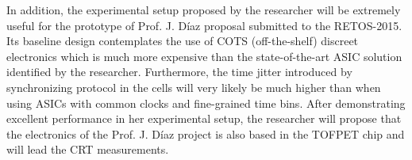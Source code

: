 In addition, the experimental setup proposed by the researcher will be extremely useful for the prototype of Prof. J. D\'iaz proposal submitted to the RETOS-2015. Its baseline design contemplates the use of COTS (off-the-shelf) discreet electronics which is much more expensive than the state-of-the-art ASIC solution identified by the researcher. Furthermore, the time jitter introduced by synchronizing protocol in the cells will very likely be much higher than when using ASICs with common clocks and fine-grained time bins. After demonstrating excellent performance in her experimental setup, the researcher will propose that the electronics of the Prof. J. D\'iaz project is also based in the TOFPET chip and will lead the CRT measurements. 
\\

